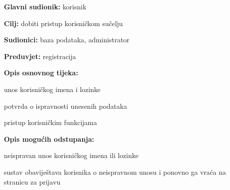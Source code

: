 \noindent {}
\begin{packed_item}
	\item \textbf{Glavni sudionik: }korisnik
	\item  \textbf{Cilj:} dobiti pristup korisničkom sučelju
	\item  \textbf{Sudionici:} baza podataka, administrator
	\item  \textbf{Preduvjet:} registracija
	\item  \textbf{Opis osnovnog tijeka:}
	
	\item[] \begin{packed_enum}
		
		\item unos korisničkog imena i lozinke
		\item potvrda o ispravnosti unesenih podataka
		\item pristup korisničkim funkcijama
	\end{packed_enum}
	
	\item  \textbf{Opis mogućih odstupanja:}
	
	\item[] \begin{packed_item}
		
		\item[1.a] neispravan unos korisničkog imena ili lozinke
		\item[] \begin{packed_enum}
			
			\item sustav obaviještava korisnika o neispravnom unosu i ponovno ga vraća na stranicu za prijavu
			
		\end{packed_enum}
	\end{packed_item}
\end{packed_item}

